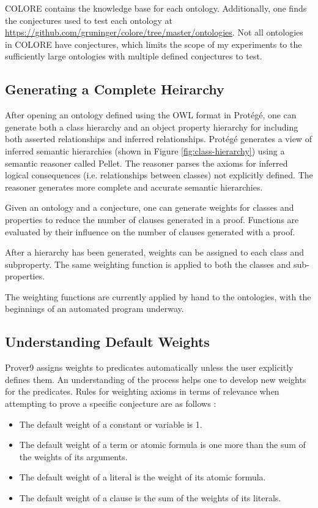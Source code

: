 \documentclass{article}
\begin{document}
COLORE contains the knowledge base for each ontology. Additionally, one finds the conjectures used to test each ontology at \url{https://github.com/gruninger/colore/tree/master/ontologies}. Not all ontologies in COLORE have conjectures, which limits the scope of my experiments to the sufficiently large ontologies with multiple defined conjectures to test. 

\subsection{Generating a Complete Heirarchy}
After opening an ontology defined using the OWL format in Prot{\'e}g{\'e}, one can generate both a class hierarchy and an object property hierarchy for including both asserted relationships and inferred relationships. Prot{\'e}g{\'e} generates a view of inferred semantic hierarchies (shown in Figure \ref{fig:class-hierarchy}) using a semantic reasoner called Pellet. The reasoner parses the axioms for inferred logical consequences (i.e. relationships between classes) not explicitly defined. The reasoner generates more complete and accurate semantic hierarchies. 

Given an ontology and a conjecture, one can generate weights for classes and properties to reduce the number of clauses generated in a proof. Functions are evaluated by their influence on the number of clauses generated with a proof. 

After a hierarchy has been generated, weights can be assigned to each class and subproperty. The same weighting function is applied to both the classes and sub-properties. 

The weighting functions are currently applied by hand to the ontologies, with the beginnings of an automated program underway. 



\subsection{Understanding Default Weights}
Prover9 assigns weights to predicates automatically unless the user explicitly defines them. An understanding of the process helps one to develop new weights for the predicates. Rules for weighting axioms in terms of relevance when attempting to prove a specific conjecture are as follows \cite{mccune2005prover9}: 

\begin{singlespace}
\centering
\begin{itemize}
    \item The default weight of a constant or variable is 1.
    \item The default weight of a term or atomic formula is one more than the sum of the weights of its arguments.
    \item The default weight of a literal is the weight of its atomic formula.
    \item The default weight of a clause is the sum of the weights of its literals.
\end{itemize}
\end{singlespace}
\end{document}
